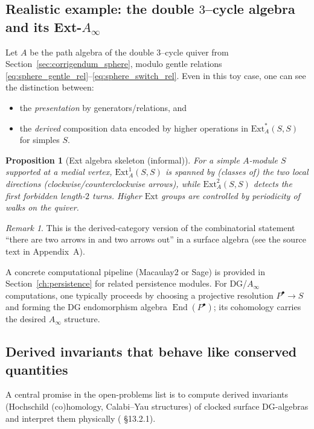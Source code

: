 \documentclass[11pt,oneside]{amsbook}
\numberwithin{equation}{section}
\theoremstyle{plain}
\newtheorem{proposition}[theorem]{Proposition}
\theoremstyle{definition}
\theoremstyle{remark}
\newtheorem{remark}[theorem]{Remark}
\DeclareMathOperator{\End}{\mathrm{End}}
\begin{document}
\subsection{Realistic example: the double $3$--cycle algebra and its Ext-$A_\infty$}
\label{sec:double3_example}

Let $A$ be the path algebra of the double $3$--cycle quiver from Section~\ref{sec:corrigendum_sphere}, modulo gentle relations \eqref{eq:sphere_gentle_rel}--\eqref{eq:sphere_switch_rel}.
Even in this toy case, one can see the distinction between:
\begin{itemize}
\item the \emph{presentation} by generators/relations, and
\item the \emph{derived} composition data encoded by higher operations in $\mathrm{Ext}^*_A(S,S)$ for simples $S$.
\end{itemize}

\begin{proposition}[Ext algebra skeleton (informal)]
For a simple $A$-module $S$ supported at a medial vertex, $\mathrm{Ext}^1_A(S,S)$ is spanned by (classes of) the two local directions (clockwise/counterclockwise arrows), while $\mathrm{Ext}^2_A(S,S)$ detects the first forbidden length-$2$ turns.
Higher $\mathrm{Ext}$ groups are controlled by periodicity of walks on the quiver.
\end{proposition}

\begin{remark}
This is the derived-category version of the combinatorial statement ``there are two arrows in and two arrows out'' in a surface algebra (see the source text in Appendix~A).
\end{remark}

A concrete computational pipeline (Macaulay2 or Sage) is provided in Section~\ref{ch:persistence} for related persistence modules.
For DG/$A_\infty$ computations, one typically proceeds by choosing a projective resolution $P^\bullet\to S$ and forming the DG endomorphism algebra $\End(P^\bullet)$; its cohomology carries the desired $A_\infty$ structure.

\subsection{Derived invariants that behave like conserved quantities}
\label{sec:derived_invariants}

A central promise in the  open-problems list is to compute derived invariants (Hochschild (co)homology, Calabi--Yau structures) of clocked surface DG-algebras and interpret them physically ( \S13.2.1).
\end{document}
